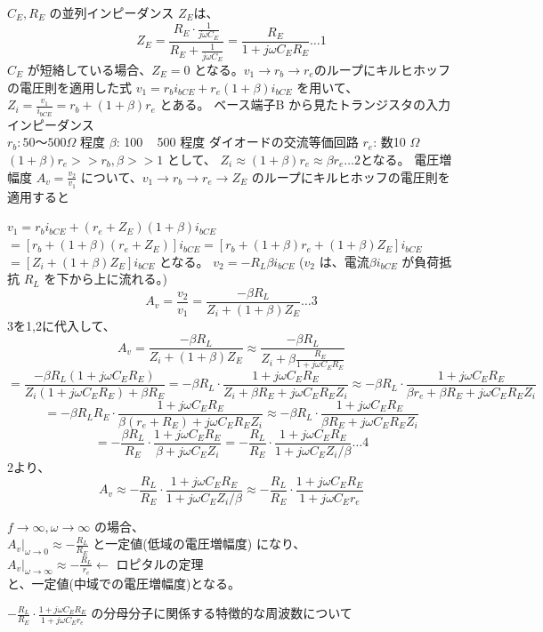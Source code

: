 $C_E, R_E$ の並列インピーダンス $Z_E$は、$$Z_E = \frac{R_E \cdot \frac{1}{j\omega C_E}}{R_E+\frac{1}{j\omega C_E}} = \frac{R_E}{1+j\omega C_ER_E}\dots1$$
$C_E$ が短絡している場合、$Z_E = 0$ となる。$v_1 \rightarrow r_b \rightarrow r_e$のループにキルヒホッフの電圧則を適用した式 $v_1 = r_bi_{bCE}+r_e(1+\beta)i_{bCE}$ を用いて、
$Z_i = \frac{v_1}{i_{bCE}} = r_b+(1+\beta)r_e$ とある。
ベース端子B から見たトランジスタの入力インピーダンス\\

$r_b: 50 ～ 500 \Omega$ 程度 $\beta$: 100 ~ 500 程度 ダイオードの交流等価回路 $r_e$: 数10 $\Omega$ $(1+\beta)r_e >> r_b, \beta >> 1$ として、
$Z_i \approx (1+\beta)r_e \approx \beta r_e\dots2$となる。
電圧増幅度 $A_v = \frac{v_2}{v_1}$ について、$v_1 \rightarrow r_b \rightarrow r_e \rightarrow Z_E$ のループにキルヒホッフの電圧則を適用すると

$v_1 = r_b i_{bCE}+(r_e+Z_E)(1+\beta)i_{bCE}$
$= [r_b+(1+\beta)(r_e+Z_E)]i_{bCE} = [r_b+(1+\beta)r_e+(1+\beta)Z_E]i_{bCE}$
$= [Z_i+(1+\beta)Z_E]i_{bCE}$ となる。
$v_2 = -R_L\beta i_{bCE}$ ($v_2$ は、電流$\beta i_{bCE}$ が負荷抵抗 $R_L$ を下から上に流れる。)
$$A_v = \frac{v_2}{v_1} =\frac{-\beta R_L}{Z_i+(1+\beta)Z_E}\dots3$$
3を1,2に代入して、
$$A_v = \frac{-\beta R_L}{Z_i+(1+\beta)Z_E} \approx \frac{-\beta R_L}{Z_i+\beta \frac{R_E}{1+j\omega C_E R_E}}$$
$$= \frac{-\beta R_L(1+j\omega C_E R_E)}{Z_i(1+j\omega C_ER_E)+\beta R_E} = -\beta R_L \cdot \frac{1+j\omega C_E R_E}{Z_i+\beta R_E+j\omega C_ER_EZ_i} \approx -\beta R_L \cdot \frac{1+j\omega C_E R_E}{\beta r_e+\beta R_E + j\omega C_E R_E Z_i}$$
$$= -\beta R_L R_E \cdot \frac{1+j\omega C_ER_E}{\beta(r_e+R_E)+j\omega C_E R_E Z_i} \approx -\beta R_L \cdot \frac{1+j\omega C_E R_E}{\beta R_E + j\omega C_E R_E Z_i}$$
$$= -\frac{\beta R_L}{R_E} \cdot \frac{1+j\omega C_E R_E}{\beta + j\omega C_E Z_i} = -\frac{R_L}{R_E} \cdot \frac{1+j\omega C_E R_E}{1+j\omega C_E Z_i/\beta}\dots4$$
2より、$$A_v \approx -\frac{R_L}{R_E}\cdot\frac{1+j\omega C_ER_E}{1+j\omega C_EZ_i/\beta} \approx -\frac{R_L}{R_E}\cdot \frac{1+j\omega C_E R_E}{1+j\omega C_E r_e}$$

$f \to \infty, \omega \to \infty$ の場合、\\
$\left.A_v\right|_{\omega \to 0} \approx -\frac{R_L}{R_E}$ と一定値(低域の電圧増幅度) になり、\\
$\left.A_v\right|_{\omega \to \infty} \approx -\frac{R_L}{r_e} \leftarrow$ ロピタルの定理\\
と、一定値(中域での電圧増幅度)となる。

$-\frac{R_L}{R_E} \cdot \frac{1+j\omega C_E R_E}{1+j\omega C_E r_e}$ の分母分子に関係する特徴的な周波数について

